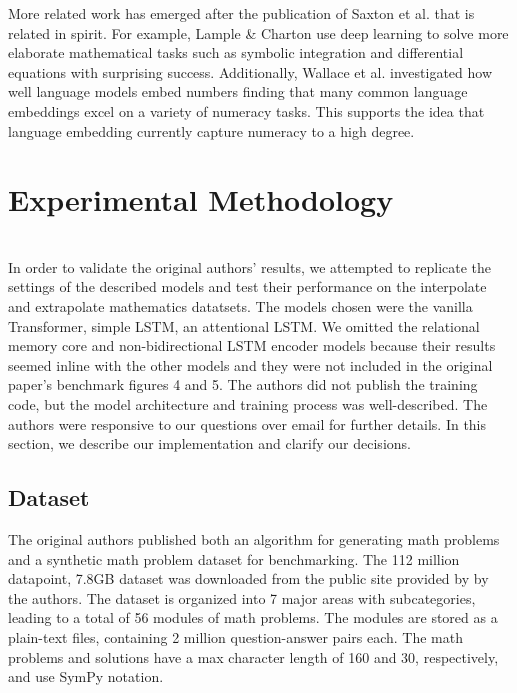 More related work has emerged after the publication of Saxton et al.\supercite{DBLP:journals/corr/abs-1904-01557} that is related in spirit. For example, Lample \& Charton \supercite{lample2019deep} use deep learning to solve more elaborate mathematical tasks such as symbolic integration and differential equations with surprising success.  Additionally, Wallace et al. \supercite{wallace2019nlp} investigated how well language models embed numbers finding that many common language embeddings excel on a variety of numeracy tasks. This supports the idea that language embedding currently capture numeracy to a high degree. \\


\section{Experimental Methodology} \\
In order to validate the original authors’ results, we attempted to replicate the settings of the described models and test their performance on the interpolate and extrapolate mathematics datatsets. The models chosen were the vanilla Transformer\supercite{vaswani2017attention}, simple LSTM, an attentional LSTM. We omitted the relational memory core and non-bidirectional LSTM encoder models because their results seemed inline with the other models and they were not included in the original paper’s benchmark figures 4 and 5. The authors did not publish the training code, but the model architecture and training process was well-described. The authors were responsive to our questions over email for further details. In this section, we describe our implementation and clarify our decisions.

\subsection{Dataset \\}
The original authors published both an algorithm for generating math problems and a synthetic math problem dataset for benchmarking. The 112 million datapoint, 7.8GB dataset was downloaded from the public site provided by by the authors\supercite{dataset}. The dataset is organized into 7 major areas with subcategories, leading to a total of 56 modules of math problems. The modules are stored as a plain-text files, containing 2 million question-answer pairs each. The math problems and solutions have a max character length of 160 and 30, respectively, and use SymPy\supercite{sympy} notation.

